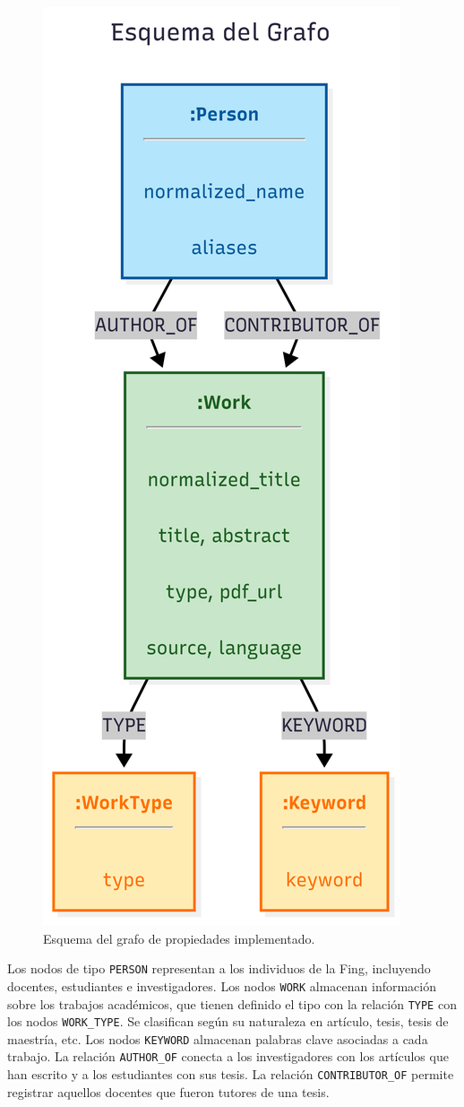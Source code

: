 \documentclass[journal]{IEEEtran}
\begin{document}
\begin{figure}[htb]
	\centering
	\includegraphics[width=0.6\linewidth]{imagenes/grafo.png}
	\caption{Esquema del grafo de propiedades implementado.}
	\label{fig:grafo}
\end{figure}
Los nodos de tipo \texttt{PERSON} representan a los individuos de la Fing, incluyendo docentes, estudiantes e investigadores. Los nodos \texttt{WORK} almacenan información sobre los trabajos académicos, que tienen definido el tipo con la relación \texttt{TYPE} con los nodos \texttt{WORK\_TYPE}. Se clasifican según su naturaleza en artículo, tesis, tesis de maestría, etc. Los nodos \texttt{KEYWORD} almacenan palabras clave asociadas a cada trabajo.
La relación \texttt{AUTHOR\_OF} conecta a los investigadores con los artículos que han escrito y a los estudiantes con sus tesis. La relación \texttt{CONTRIBUTOR\_OF} permite registrar aquellos docentes que fueron tutores de una tesis.
\end{document}
